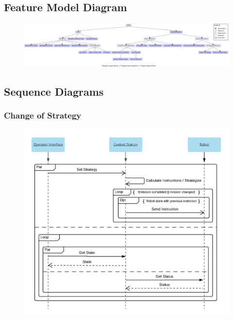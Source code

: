 \subsection{Feature Model Diagram}
\begin{figure}[H]
    \includegraphics[width=22cm,angle=-90]{docs/assignments/Final_project/feature_model.png}
\end{figure}
\newpage


\subsection{Sequence Diagrams}
\subsubsection{Change of Strategy}
\begin{figure}[H]
\includegraphics[width=15cm]{docs/assignments/Final_project/seq_diagram1.png}
\end{figure}
\newpage

